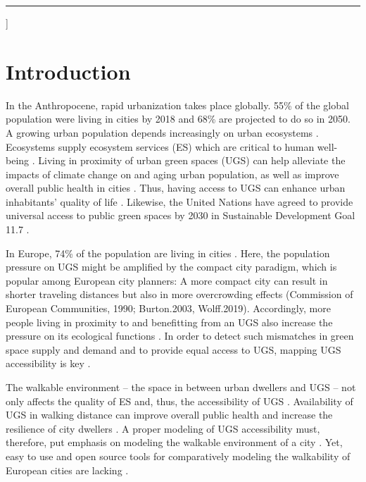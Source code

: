 \documentclass[10pt]{article}
\begin{document}
\vspace*{.5cm}

\hrule

\par\vspace{2ex}]



\vspace{.5cm}

\normalsize


\section{Introduction}
In the Anthropocene, rapid urbanization takes place globally. 55\% of the global population were living in cities by 2018 and 68\% are projected to do so in 2050.
A growing urban population depends increasingly on urban ecosystems \citep{Elmqvist.2021, UN.2019}.
Ecosystems supply ecosystem services (ES) which are critical to human well-being \citep{Fisher.2009}.
Living in proximity of urban green spaces (UGS) can help alleviate the impacts of climate change on and aging urban population, as well as improve overall public health in cities \citep{Kabisch.2021, Kabisch.2021b}.
Thus, having access to UGS can enhance urban inhabitants’ quality of life \citep{Poelman.2018}.
Likewise, the United Nations have agreed to provide universal access to public green spaces by 2030 in Sustainable Development Goal 11.7 \citep{UN.2017}.

In Europe, 74\% of the population are living in cities \citep{UN.2019}.
Here, the population pressure on UGS might be amplified by the compact city paradigm, which is popular among European city planners: A more compact city can result in shorter traveling distances but also in more overcrowding effects (Commission of European Communities, 1990; Burton.2003, Wolff.2019).
Accordingly, more people living in proximity to and benefitting from an UGS also increase the pressure on its ecological functions \citep{Wolff.2019}.
In order to detect such mismatches in green space supply and demand and to provide equal access to UGS, mapping UGS accessibility is key \citep{Larondelle.2013}.

The walkable environment – the space in between urban dwellers and UGS – not only affects the quality of ES and, thus, the accessibility of UGS \citep{Syrbe.2012}.
Availability of UGS in walking distance can improve overall public health and increase the resilience of city dwellers \citep{Kabisch.2021,Richardson.2013}.
A proper modeling of UGS accessibility must, therefore, put emphasis on modeling the walkable environment of a city \citep{Wolff.2019}.
Yet, easy to use and open source tools for comparatively modeling the walkability of European cities are lacking \citep{Kabisch.2016}.
\end{document}
